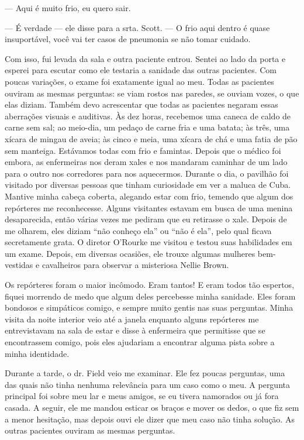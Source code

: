 --- Aqui é muito frio, eu quero sair.

--- É verdade --- ele disse para a srta. Scott. --- O frio aqui dentro é
quase insuportável, você vai ter casos de pneumonia se não tomar
cuidado.

Com isso, fui levada da sala e outra paciente entrou. Sentei ao lado da
porta e esperei para escutar como ele testaria a sanidade das outras
pacientes. Com poucas variações, o exame foi exatamente igual ao meu.
Todas as pacientes ouviram as mesmas perguntas: se viam rostos nas
paredes, se ouviam vozes, o que elas diziam. Também devo acrescentar que
todas as pacientes negaram essas aberrações visuais e auditivas. Às dez
horas, recebemos uma caneca de caldo de carne sem sal; ao meio-dia, um
pedaço de carne fria e uma batata; às três, uma xícara de mingau de
aveia; às cinco e meia, uma xícara de chá e uma fatia de pão sem
manteiga. Estávamos todas com frio e famintas. Depois que o médico foi
embora, as enfermeiras nos deram xales e nos mandaram caminhar de um
lado para o outro nos corredores para nos aquecermos. Durante o dia, o
pavilhão foi visitado por diversas pessoas que tinham curiosidade em ver
a maluca de Cuba. Mantive minha cabeça coberta, alegando estar com frio,
temendo que algum dos repórteres me reconhecesse. Alguns visitantes
estavam em busca de uma menina desaparecida, então várias vezes me
pediram que eu retirasse o xale. Depois de me olharem, eles diziam ``não
conheço ela'' ou ``não é ela'', pelo qual ficava secretamente grata. O
diretor O'Rourke me visitou e testou suas habilidades em um exame.
Depois, em diversas ocasiões, ele trouxe algumas mulheres bem-vestidas e
cavalheiros para observar a misteriosa Nellie Brown.

Os repórteres foram o maior incômodo. Eram tantos! E eram todos tão
espertos, fiquei morrendo de medo que algum deles percebesse minha
sanidade. Eles foram bondosos e simpáticos comigo, e sempre muito gentis
nas suas perguntas. Minha visita da noite interior veio até a janela
enquanto alguns repórteres me entrevistavam na sala de estar e disse à
enfermeira que permitisse que se encontrassem comigo, pois eles
ajudariam a encontrar alguma pista sobre a minha identidade.

Durante a tarde, o dr. Field veio me examinar. Ele fez poucas perguntas,
uma das quais não tinha nenhuma relevância para um caso como o meu. A
pergunta principal foi sobre meu lar e meus amigos, se eu tivera
namorados ou já fora casada. A seguir, ele me mandou esticar os braços e
mover os dedos, o que fiz sem a menor hesitação, mas depois ouvi ele
dizer que meu caso não tinha solução. As outras pacientes ouviram as
mesmas perguntas.

